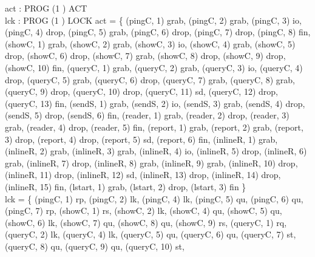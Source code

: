 \documentclass[a4paper,10pt,fleqn]{article}
\begin{document}
\begin{axdef}
  act : PROG \cross (1 ) \pfun ACT \\
  lck : PROG \cross (1 ) \pfun LOCK
\where
  act = \{ (pingC, 1) \mapsto grab, (pingC, 2) \mapsto grab, (pingC, 3) \mapsto io,
    (pingC, 4) \mapsto drop, (pingC, 5) \mapsto grab, (pingC, 6) \mapsto drop,
    (pingC, 7) \mapsto drop, (pingC, 8) \mapsto fin,
    (showC, 1) \mapsto grab, (showC, 2) \mapsto grab, (showC, 3) \mapsto io,
    (showC, 4) \mapsto grab, (showC, 5) \mapsto drop, (showC, 6) \mapsto drop,
    (showC, 7) \mapsto grab, (showC, 8) \mapsto drop, (showC, 9) \mapsto drop,
    (showC, 10) \mapsto fin,
    (queryC, 1) \mapsto grab, (queryC, 2) \mapsto grab, (queryC, 3) \mapsto io,
    (queryC, 4) \mapsto drop, (queryC, 5) \mapsto grab, (queryC, 6) \mapsto drop,
    (queryC, 7) \mapsto grab, (queryC, 8) \mapsto grab, (queryC, 9) \mapsto drop,
    (queryC, 10) \mapsto drop, (queryC, 11) \mapsto sd, (queryC, 12) \mapsto drop,
    (queryC, 13) \mapsto fin,
    (sendS, 1) \mapsto grab, (sendS, 2) \mapsto io, (sendS, 3) \mapsto grab,
    (sendS, 4) \mapsto drop, (sendS, 5) \mapsto drop, (sendS, 6) \mapsto fin,
    (reader, 1) \mapsto grab, (reader, 2) \mapsto drop, (reader, 3) \mapsto grab,
    (reader, 4) \mapsto drop, (reader, 5) \mapsto fin,
    (report, 1) \mapsto grab, (report, 2) \mapsto grab, (report, 3) \mapsto drop,
    (report, 4) \mapsto drop, (report, 5) \mapsto sd, (report, 6) \mapsto fin,
    (inlineR, 1) \mapsto grab, (inlineR, 2) \mapsto grab, (inlineR, 3) \mapsto grab,
    (inlineR, 4) \mapsto io, (inlineR, 5) \mapsto drop, (inlineR, 6) \mapsto grab,
    (inlineR, 7) \mapsto drop, (inlineR, 8) \mapsto grab, (inlineR, 9) \mapsto grab,
    (inlineR, 10) \mapsto drop, (inlineR, 11) \mapsto drop, (inlineR, 12) \mapsto sd,
    (inlineR, 13) \mapsto drop, (inlineR, 14) \mapsto drop, (inlineR, 15) \mapsto fin,
    (lstart, 1) \mapsto grab, (lstart, 2) \mapsto drop, (lstart, 3) \mapsto fin \} \\
  lck = \{ (pingC, 1) \mapsto rp, (pingC, 2) \mapsto lk, (pingC, 4) \mapsto lk,
    (pingC, 5) \mapsto qu, (pingC, 6) \mapsto qu, (pingC, 7) \mapsto rp,
    (showC, 1) \mapsto rs, (showC, 2) \mapsto lk, (showC, 4) \mapsto qu,
    (showC, 5) \mapsto qu, (showC, 6) \mapsto lk, (showC, 7) \mapsto qu,
    (showC, 8) \mapsto qu, (showC, 9) \mapsto rs,
    (queryC, 1) \mapsto rq, (queryC, 2) \mapsto lk, (queryC, 4) \mapsto lk,
    (queryC, 5) \mapsto qu, (queryC, 6) \mapsto qu, (queryC, 7) \mapsto st,
    (queryC, 8) \mapsto qu, (queryC, 9) \mapsto qu, (queryC, 10) \mapsto st,

\end{axdef}
\end{document}
